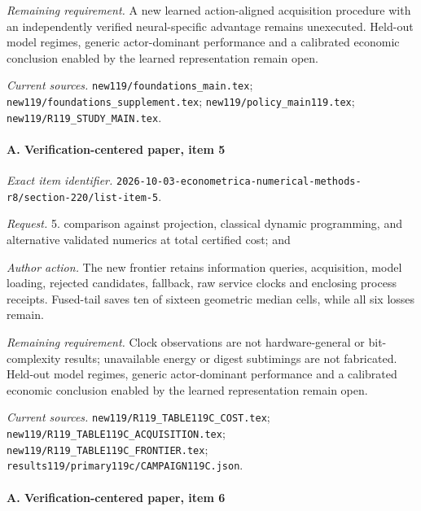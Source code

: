 \par\emph{Remaining requirement.} A new learned action-aligned acquisition procedure with an independently verified neural-specific advantage remains unexecuted. Held-out model regimes, generic actor-dominant performance and a calibrated economic conclusion enabled by the learned representation remain open.

\par\emph{Current sources.} \nolinkurl{new119/foundations_main.tex}; \nolinkurl{new119/foundations_supplement.tex}; \nolinkurl{new119/policy_main119.tex}; \nolinkurl{new119/R119_STUDY_MAIN.tex}.

\paragraph{A. Verification-centered paper, item 5}

\emph{Exact item identifier.} \nolinkurl{2026-10-03-econometrica-numerical-methods-r8/section-220/list-item-5}.

\par\emph{Request.} 5. comparison against projection, classical dynamic programming, and alternative validated numerics at total certified cost; and

\par\emph{Author action.} The new frontier retains information queries, acquisition, model loading, rejected candidates, fallback, raw service clocks and enclosing process receipts. Fused-tail saves ten of sixteen geometric median cells, while all six losses remain.

\par\emph{Remaining requirement.} Clock observations are not hardware-general or bit-complexity results; unavailable energy or digest subtimings are not fabricated. Held-out model regimes, generic actor-dominant performance and a calibrated economic conclusion enabled by the learned representation remain open.

\par\emph{Current sources.} \nolinkurl{new119/R119_TABLE119C_COST.tex}; \nolinkurl{new119/R119_TABLE119C_ACQUISITION.tex}; \nolinkurl{new119/R119_TABLE119C_FRONTIER.tex}; \nolinkurl{results119/primary119c/CAMPAIGN119C.json}.

\paragraph{A. Verification-centered paper, item 6}

